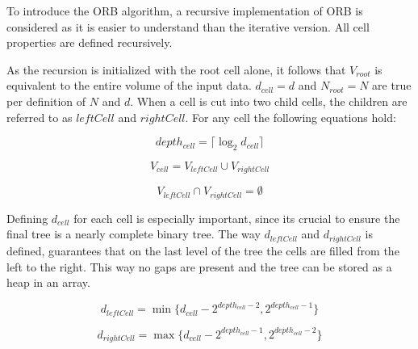 \documentclass[]{article}
\begin{document}
To introduce the ORB algorithm, a recursive implementation of ORB is considered as it is easier to understand than the iterative version. All cell properties are defined recursively.

As the recursion is initialized with the root cell alone, it follows that $V_{root}$ is equivalent to the entire volume of the input data. $d_{cell} = d$ and $N_{root} = N$ are true per definition of $N$ and $d$. 
When a cell is cut into two child cells, the children are referred to as $leftCell$ and $rightCell$. For any cell the following equations hold:

\begin{center}
	\begin{equation} \label{eq:l}
		depth_{cell} = \lceil \log_2{d_{cell}} \rceil 
	\end{equation}
\end{center}

\begin{center}
	\begin{equation}\label{eq:v}
		V_{cell} = V_{leftCell} \cup V_{rightCell}
	\end{equation}
\end{center}

\begin{center}
	\begin{equation}\label{eq:v2}
		V_{leftCell} \cap V_{rightCell} = \emptyset
	\end{equation}
\end{center}

Defining $d_{cell}$ for each cell is especially important, since its crucial to ensure the final tree is a nearly complete binary tree. The way $d_{leftCell}$ and $d_{rightCell}$ is defined, guarantees that on the last level of the tree the cells are filled from the left to the right. This way no gaps are present and the tree can be stored as a heap in an array. 

\begin{center}
	\begin{equation} \label{eq:d1}
		d_{leftCell} = \min \{ d_{cell} - 2^{depth_{cell} -2}, 2^{depth_{cell} - 1}\}
	\end{equation}
\end{center}

\begin{center}
	\begin{equation}  \label{eq:d2}
		d_{rightCell} = \max \{ d_{cell} - 2^{depth_{cell} -1}, 2^{depth_{cell} - 2}\}
	\end{equation}
\end{center}
\end{document}
